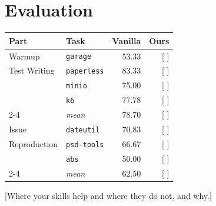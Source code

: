 \documentclass[11pt]{article}
\begin{document}
\section{Evaluation}

\begin{center}
\small
\begin{tabular}{@{}llrr@{}}
\toprule
Part & Task & Vanilla & Ours \\
\midrule
Warmup & \texttt{garage} & 53.33 & [ ] \\
\midrule
Test Writing & \texttt{paperless} & 83.33 & [ ] \\
 & \texttt{minio} & 75.00 & [ ] \\
 & \texttt{k6} & 77.78 & [ ] \\
\cmidrule(l){2-4}
 & \emph{mean} & 78.70 & [ ] \\
\midrule
Issue & \texttt{dateutil} & 70.83 & [ ] \\
Reproduction & \texttt{psd-tools} & 66.67 & [ ] \\
 & \texttt{abs} & 50.00 & [ ] \\
\cmidrule(l){2-4}
 & \emph{mean} & 62.50 & [ ] \\
\bottomrule
\end{tabular}
\label{tab:scores}
\end{center}

[Where your skills help and where they do not, and why.]


\end{document}
